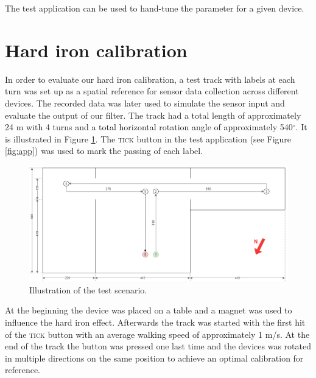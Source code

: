 The test application can be used to hand-tune the parameter for a given device.

\section{Hard iron calibration}


In order to evaluate our hard iron calibration, a test track with labels at each turn was set up as a spatial reference for sensor data collection across different devices. The recorded data was later used to simulate the sensor input and evaluate the output of our filter. The track had a total length of approximately 24 m with 4 turns and a total horizontal rotation angle of approximately 540$^{\circ}$. It is illustrated in Figure \ref{fig:eval_scenario}. The \textsc{tick} button in the test application (see Figure \ref{fig:app}) was used to mark the passing of each label.

\begin{figure}[H]
    \centering
    \includegraphics[width=1.0\textwidth]{figures/scenario.png}
    \caption{Illustration of the test scenario.}
    \label{fig:eval_scenario}
\end{figure}

At the beginning the device was placed on a table and a magnet was used to influence the hard iron effect. Afterwards the track was started with the first hit of the \textsc{tick} button with an average walking speed of approximately 1 m/s. At the end of the track the button was pressed one last time and the devices was rotated in multiple directions on the same position to achieve an optimal calibration for reference.

